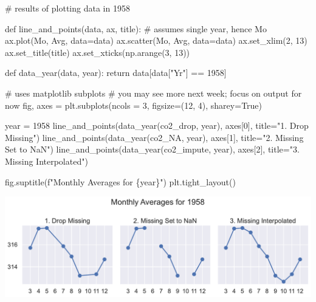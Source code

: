 \documentclass[
  letterpaper,
  DIV=11,
  numbers=noendperiod]{scrreprt}
\newenvironment{Shaded}{\begin{snugshade}}{\end{snugshade}}
\newcommand{\CommentTok}[1]{\textcolor[rgb]{0.37,0.37,0.37}{#1}}
\newcommand{\ControlFlowTok}[1]{\textcolor[rgb]{0.00,0.23,0.31}{#1}}
\newcommand{\DecValTok}[1]{\textcolor[rgb]{0.68,0.00,0.00}{#1}}
\newcommand{\KeywordTok}[1]{\textcolor[rgb]{0.00,0.23,0.31}{#1}}
\newcommand{\NormalTok}[1]{\textcolor[rgb]{0.00,0.23,0.31}{#1}}
\newcommand{\OperatorTok}[1]{\textcolor[rgb]{0.37,0.37,0.37}{#1}}
\newcommand{\SpecialCharTok}[1]{\textcolor[rgb]{0.37,0.37,0.37}{#1}}
\newcommand{\SpecialStringTok}[1]{\textcolor[rgb]{0.13,0.47,0.30}{#1}}
\newcommand{\StringTok}[1]{\textcolor[rgb]{0.13,0.47,0.30}{#1}}
\newcommand{\VariableTok}[1]{\textcolor[rgb]{0.07,0.07,0.07}{#1}}
\begin{document}
\begin{Shaded}
\begin{Highlighting}[]
\CommentTok{\# results of plotting data in 1958}

\KeywordTok{def}\NormalTok{ line\_and\_points(data, ax, title):}
    \CommentTok{\# assumes single year, hence Mo}
\NormalTok{    ax.plot(}\StringTok{\textquotesingle{}Mo\textquotesingle{}}\NormalTok{, }\StringTok{\textquotesingle{}Avg\textquotesingle{}}\NormalTok{, data}\OperatorTok{=}\NormalTok{data)}
\NormalTok{    ax.scatter(}\StringTok{\textquotesingle{}Mo\textquotesingle{}}\NormalTok{, }\StringTok{\textquotesingle{}Avg\textquotesingle{}}\NormalTok{, data}\OperatorTok{=}\NormalTok{data)}
\NormalTok{    ax.set\_xlim(}\DecValTok{2}\NormalTok{, }\DecValTok{13}\NormalTok{)}
\NormalTok{    ax.set\_title(title)}
\NormalTok{    ax.set\_xticks(np.arange(}\DecValTok{3}\NormalTok{, }\DecValTok{13}\NormalTok{))}

\KeywordTok{def}\NormalTok{ data\_year(data, year):}
    \ControlFlowTok{return}\NormalTok{ data[data[}\StringTok{"Yr"}\NormalTok{] }\OperatorTok{==} \DecValTok{1958}\NormalTok{]}
    
\CommentTok{\# uses matplotlib subplots}
\CommentTok{\# you may see more next week; focus on output for now}
\NormalTok{fig, axes }\OperatorTok{=}\NormalTok{ plt.subplots(ncols }\OperatorTok{=} \DecValTok{3}\NormalTok{, figsize}\OperatorTok{=}\NormalTok{(}\DecValTok{12}\NormalTok{, }\DecValTok{4}\NormalTok{), sharey}\OperatorTok{=}\VariableTok{True}\NormalTok{)}

\NormalTok{year }\OperatorTok{=} \DecValTok{1958}
\NormalTok{line\_and\_points(data\_year(co2\_drop, year), axes[}\DecValTok{0}\NormalTok{], title}\OperatorTok{=}\StringTok{"1. Drop Missing"}\NormalTok{)}
\NormalTok{line\_and\_points(data\_year(co2\_NA, year), axes[}\DecValTok{1}\NormalTok{], title}\OperatorTok{=}\StringTok{"2. Missing Set to NaN"}\NormalTok{)}
\NormalTok{line\_and\_points(data\_year(co2\_impute, year), axes[}\DecValTok{2}\NormalTok{], title}\OperatorTok{=}\StringTok{"3. Missing Interpolated"}\NormalTok{)}

\NormalTok{fig.suptitle(}\SpecialStringTok{f"Monthly Averages for }\SpecialCharTok{\{}\NormalTok{year}\SpecialCharTok{\}}\SpecialStringTok{"}\NormalTok{)}
\NormalTok{plt.tight\_layout()}
\end{Highlighting}
\end{Shaded}

\includegraphics{eda/eda_files/figure-pdf/cell-75-output-1.pdf}
\end{document}
